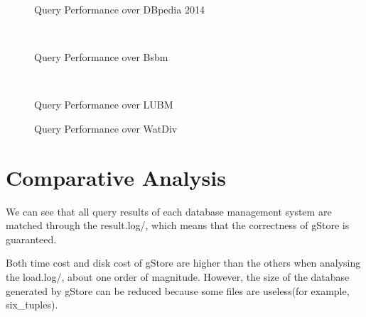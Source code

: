 \documentclass[titlepage, a4paper, 12pt] {article}
\begin{document}
\begin{figure}[b]%
	\resizebox{0.48\columnwidth}{!}{
		
	}
	\caption{Query Performance over DBpedia 2014}%
	\label{fig:dbpedia2014Performance}
\end{figure}

\begin{figure}%
	\subfigure[BSBM 10000]{%
		\resizebox{0.8\columnwidth}{!}{
			
		}	
		\label{fig:Bsbm10000Performance}%
	}
	\\
	\subfigure[BSBM 100000]{%
		\resizebox{0.8\columnwidth}{!}{
			
		}
		\label{fig:BSBM100000Performance}%
	}
	\caption{Query Performance over Bsbm}%
	\label{fig:BSBMPerformance}
\end{figure}


\begin{figure}[t]%
	\subfigure[LUBM 500]{%
		\resizebox{0.98\columnwidth}{!}{
			
		}
		\label{fig:LUBM500Performance}%
	}
	\\
	\subfigure[LUBM 5000]{%
		\resizebox{0.98\columnwidth}{!}{
			
		}
		\label{fig:LUBM5000Performance}%
	}%
	\caption{Query Performance over LUBM}%
	\label{fig:LUBMPerformance}
\end{figure}

\begin{figure}[t]%
	\subfigure[WatDiv 10M]{%
		\resizebox{0.8\columnwidth}{!}{
			
		}
		\label{fig:WatDiv10MPerformance}%
	}
	\subfigure[WatDiv 100M]{%
		\resizebox{0.8\columnwidth}{!}{
			
		}
		\label{fig:WatDiv100MPerformance}%
	}
	\subfigure[WatDiv 300M]{%
		\resizebox{0.8\columnwidth}{!}{
			
		}
		\label{fig:WatDiv300MPerformance}%
	}%
	\caption{Query Performance over WatDiv}%
	\label{fig:WatDivPerformance}
\end{figure}

\clearpage

\section{Comparative Analysis}

We can see that all query results of each database management system are matched through the result.log/, 
which means that the correctness of gStore is guaranteed. 

Both time cost and disk cost of gStore are higher than the others when analysing the load.log/,  
about one order of magnitude.  However, the size of the database generated by gStore can be reduced
because some files are useless(for example, six\_tuples).
\end{document}
